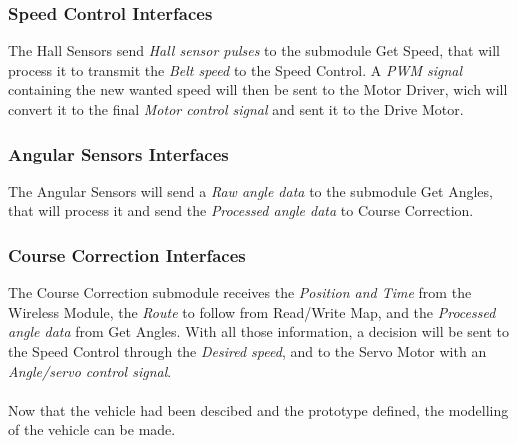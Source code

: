 \subsubsection{Speed Control Interfaces}
The Hall Sensors send \textit{Hall sensor pulses} to the submodule Get Speed, that will process it to transmit the \textit{Belt speed} to the Speed Control. A \textit{PWM signal} containing the new wanted speed will then be sent to the Motor Driver, wich will convert it to the final \textit{Motor control signal} and sent it to the Drive Motor.

\subsubsection{Angular Sensors Interfaces}
The Angular Sensors will send a \textit{Raw angle data} to the submodule  Get Angles, that will process it and send the \textit{Processed angle data} to Course Correction.

\subsubsection{Course Correction Interfaces}
The Course Correction submodule receives the \textit{Position and Time} from the Wireless Module, the \textit{Route} to follow from Read/Write Map, and the \textit{Processed angle data} from Get Angles. With all those information, a decision will be sent to the Speed Control through the \textit{Desired speed}, and to the Servo Motor with an \textit{Angle/servo control signal}.\\\\


Now that the vehicle had been descibed and the prototype defined, the modelling of the vehicle can be made.


